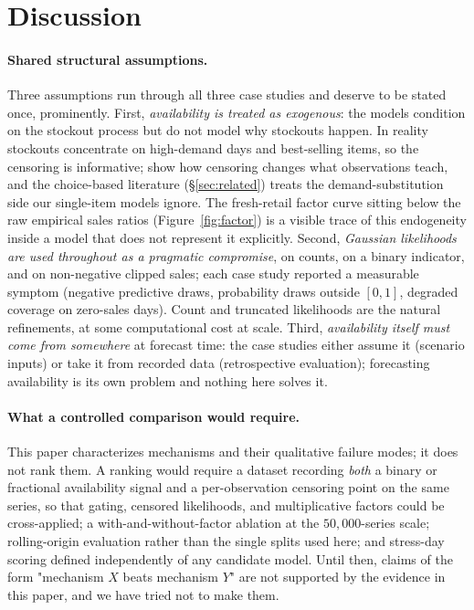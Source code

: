 \section{Discussion}\label{sec:discussion}

\paragraph{Shared structural assumptions.}
Three assumptions run through all three case studies and deserve to be stated once, prominently. First, \emph{availability is treated as exogenous}: the models condition on the stockout process but do not model why stockouts happen. In reality stockouts concentrate on high-demand days and best-selling items, so the censoring is informative; \citet{braden1991informational} show how censoring changes what observations teach, and the choice-based literature (\S\ref{sec:related}) treats the demand-substitution side our single-item models ignore. The fresh-retail factor curve sitting below the raw empirical sales ratios (Figure~\ref{fig:factor}) is a visible trace of this endogeneity inside a model that does not represent it explicitly. Second, \emph{Gaussian likelihoods are used throughout as a pragmatic compromise}, on counts, on a binary indicator, and on non-negative clipped sales; each case study reported a measurable symptom (negative predictive draws, probability draws outside $[0,1]$, degraded coverage on zero-sales days). Count and truncated likelihoods are the natural refinements, at some computational cost at scale. Third, \emph{availability itself must come from somewhere} at forecast time: the case studies either assume it (scenario inputs) or take it from recorded data (retrospective evaluation); forecasting availability is its own problem and nothing here solves it.

\paragraph{What a controlled comparison would require.}
This paper characterizes mechanisms and their qualitative failure modes; it does not rank them. A ranking would require a dataset recording \emph{both} a binary or fractional availability signal and a per-observation censoring point on the same series, so that gating, censored likelihoods, and multiplicative factors could be cross-applied; a with-and-without-factor ablation at the $50{,}000$-series scale; rolling-origin evaluation rather than the single splits used here; and stress-day scoring defined independently of any candidate model. Until then, claims of the form "mechanism $X$ beats mechanism $Y$" are not supported by the evidence in this paper, and we have tried not to make them.

